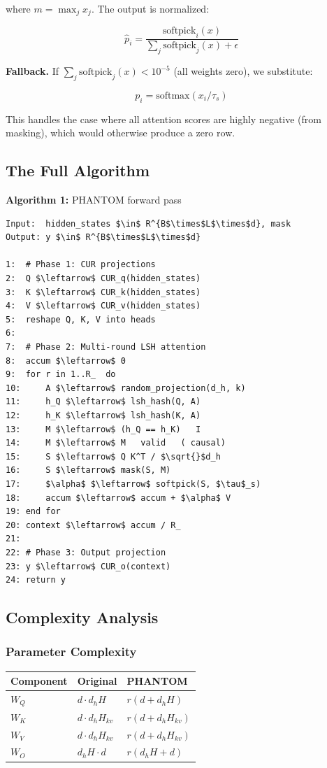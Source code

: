 where $m = \max_j x_j$. The output is normalized:

\[
\hat{p}_i = \frac{\text{softpick}_i(x)}{\sum_j \text{softpick}_j(x) + \epsilon}
\tag{4.25}
\]

\textbf{Fallback.} If $\sum_j \text{softpick}_j(x) < 10^{-5}$ (all weights zero), 
we substitute:

\[
p_i = \text{softmax}(x_i / \tau_s)
\tag{4.26}
\]

This handles the case where all attention scores are highly negative (from 
masking), which would otherwise produce a zero row.

\subsection{The Full Algorithm}

\textbf{Algorithm 1:} PHANTOM forward pass
\begin{lstlisting}
Input:  hidden_states $\in$ R^{B$\times$L$\times$d}, mask
Output: y $\in$ R^{B$\times$L$\times$d}

1:  # Phase 1: CUR projections
2:  Q $\leftarrow$ CUR_q(hidden_states)
3:  K $\leftarrow$ CUR_k(hidden_states)
4:  V $\leftarrow$ CUR_v(hidden_states)
5:  reshape Q, K, V into heads
6:
7:  # Phase 2: Multi-round LSH attention
8:  accum $\leftarrow$ 0
9:  for r in 1..R_  do
10:     A $\leftarrow$ random_projection(d_h, k)
11:     h_Q $\leftarrow$ lsh_hash(Q, A)
12:     h_K $\leftarrow$ lsh_hash(K, A)
13:     M $\leftarrow$ (h_Q == h_K)   I
14:     M $\leftarrow$ M   valid   ( causal)
15:     S $\leftarrow$ Q K^T / $\sqrt{}$d_h
16:     S $\leftarrow$ mask(S, M)
17:     $\alpha$ $\leftarrow$ softpick(S, $\tau$_s)
18:     accum $\leftarrow$ accum + $\alpha$ V
19: end for
20: context $\leftarrow$ accum / R_ 
21:
22: # Phase 3: Output projection
23: y $\leftarrow$ CUR_o(context)
24: return y
\end{lstlisting}

\subsection{Complexity Analysis}

\subsubsection{Parameter Complexity}

\begin{table}[H]
\centering
\small
\begin{tabular}{lll}
\toprule
\textbf{Component} & \textbf{Original} & \textbf{PHANTOM} \\
\midrule
$W_Q$ & $d \cdot d_h H$ & $r(d + d_h H)$ \\
$W_K$ & $d \cdot d_h H_{kv}$ & $r(d + d_h H_{kv})$ \\
$W_V$ & $d \cdot d_h H_{kv}$ & $r(d + d_h H_{kv})$ \\
$W_O$ & $d_h H \cdot d$ & $r(d_h H + d)$ \\
\bottomrule
\end{tabular}
\end{table}

